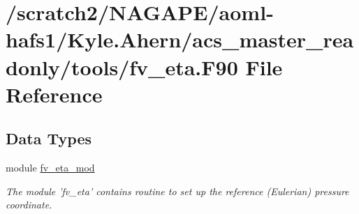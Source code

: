 \section{/scratch2/\-N\-A\-G\-A\-P\-E/aoml-\/hafs1/\-Kyle.Ahern/acs\-\_\-master\-\_\-readonly/tools/fv\-\_\-eta.F90 File Reference}
\label{fv__eta_8F90}
\subsection*{Data Types}
\begin{DoxyCompactItemize}
\item 
module \hyperlink{classfv__eta__mod}{fv\-\_\-eta\-\_\-mod}
\begin{DoxyCompactList}\small\item\em The module 'fv\-\_\-eta' contains routine to set up the reference (Eulerian) pressure coordinate. \end{DoxyCompactList}\end{DoxyCompactItemize}

